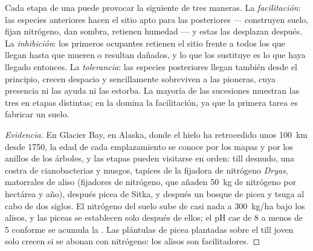 \begin{proposition}\label{prop:b1:ecosystem-dynamics:mechanisms}
Cada etapa de una  puede provocar la siguiente de tres maneras. La
\emph{facilitación}: las especies anteriores hacen el sitio apto para las
posteriores --- construyen suelo, fijan nitrógeno, dan sombra, retienen
humedad --- y estas las desplazan después. La \emph{inhibición}: los
primeros ocupantes retienen el sitio frente a todos los que llegan hasta que
mueren o resultan dañados, y lo que los sustituye es lo que haya llegado
entonces. La \emph{tolerancia}: las especies posteriores llegan también
desde el principio, crecen despacio y sencillamente sobreviven a las
pioneras, cuya presencia ni las ayuda ni las estorba. La mayoría de las
sucesiones muestran las tres en etapas distintas; en la 
domina la facilitación, ya que la primera tarea es fabricar un suelo.
\end{proposition}
\begin{proof}[Evidencia]
En Glacier Bay, en Alaska, donde el hielo ha retrocedido unos \qty{100}{km}
desde 1750, la edad de cada emplazamiento se conoce por los mapas y por los
anillos de los árboles, y las etapas pueden visitarse en orden: till
desnudo, una costra de cianobacterias y musgos, tapices de la fijadora de
nitrógeno \emph{Dryas}, matorrales de aliso (fijadores de nitrógeno, que
añaden \qty{50}{kg} de nitrógeno por hectárea y año), después picea de
Sitka, y después un bosque de picea y tsuga al cabo de dos siglos. El
nitrógeno del suelo sube de casi nada a \qty{300}{kg/ha} bajo los alisos, y
las piceas se establecen solo después de ellos; el pH cae de 8 a menos de 5
conforme se acumula la . Las plántulas de picea plantadas sobre el
till joven solo crecen si se abonan con nitrógeno: los alisos son
facilitadores.
\end{proof}

